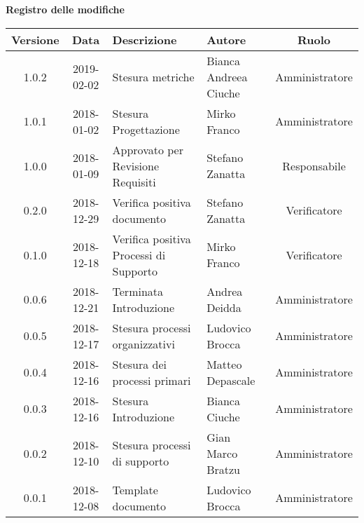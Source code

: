 \begin{center}
	\textbf{Registro delle modifiche}
	\end{center}
	\begin{center}
		\begin{tabularx}{\textwidth}{|c|c|X|X|c|}
			\hline
			\textbf{Versione} & \textbf{Data} & \textbf{Descrizione} & \textbf{Autore} & \textbf{Ruolo} \\
			\hline
			1.0.2 & 2019-02-02 & Stesura metriche & Bianca Andreea Ciuche & Amministratore\\
			\hline
			1.0.1 & 2018-01-02 & Stesura Progettazione & Mirko Franco & Amministratore \\
			\hline
			1.0.0 & 2018-01-09 & Approvato per Revisione Requisiti & Stefano Zanatta & Responsabile\\
			\hline
			0.2.0 & 2018-12-29 & Verifica positiva documento & Stefano Zanatta & Verificatore\\
			\hline
			0.1.0 & 2018-12-18 & Verifica positiva Processi di Supporto & Mirko Franco & Verificatore\\
			\hline
			0.0.6 & 2018-12-21 & Terminata Introduzione & Andrea Deidda & Amministratore\\
			\hline
			0.0.5 & 2018-12-17 & Stesura processi organizzativi & Ludovico Brocca & Amministratore\\
			\hline
			0.0.4 & 2018-12-16 & Stesura dei processi primari & Matteo Depascale & Amministratore\\
			\hline
			0.0.3 & 2018-12-16 & Stesura Introduzione & Bianca Ciuche & Amministratore\\
			\hline
			0.0.2 & 2018-12-10 & Stesura processi di supporto & Gian Marco Bratzu & Amministratore\\	
			\hline
			0.0.1 & 2018-12-08 & Template documento  & Ludovico Brocca & Amministratore\\
			\hline
		\end{tabularx}
	\end{center}

\newpage